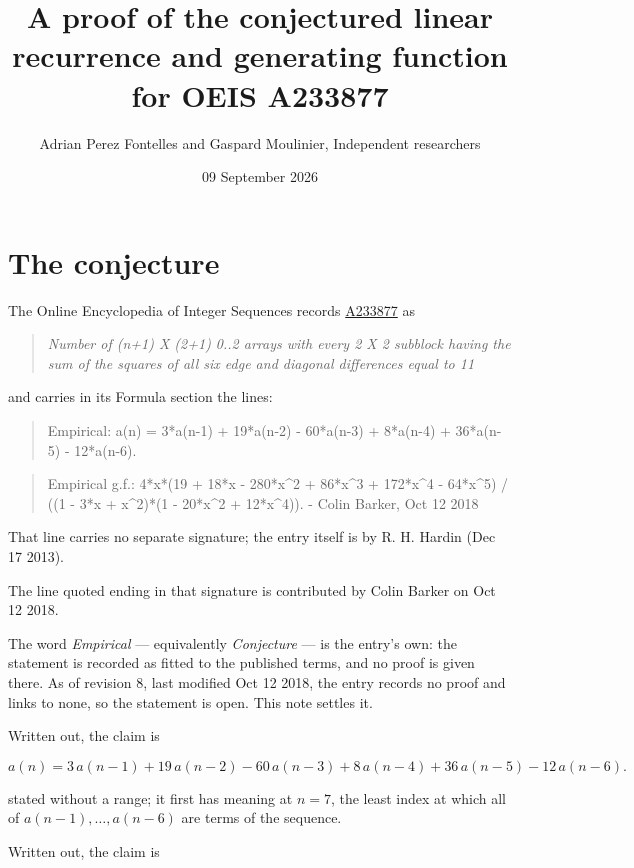 \documentclass[11pt]{article}
\title{A proof of the conjectured linear recurrence and generating function for OEIS A233877}
\author{Adrian Perez Fontelles and Gaspard Moulinier, Independent researchers}
\date{09 September 2026}
\theoremstyle{definition}
\begin{document}
\maketitle
\section{The conjecture}

The Online Encyclopedia of Integer Sequences records \href{https://oeis.org/A233877}{A233877} as

\begin{quote}\itshape Number of (n+1) X (2+1) 0..2 arrays with every 2 X 2 subblock having the sum of the squares of all six edge and diagonal differences equal to 11\end{quote}

and carries in its Formula section the lines:

\begin{quote}\ttfamily Empirical: a(n) = 3*a(n-1) + 19*a(n-2) - 60*a(n-3) + 8*a(n-4) + 36*a(n-5) - 12*a(n-6).\end{quote}

\begin{quote}\ttfamily Empirical g.f.: 4*x*(19 + 18*x - 280*x\textasciicircum{}2 + 86*x\textasciicircum{}3 + 172*x\textasciicircum{}4 - 64*x\textasciicircum{}5) / ((1 - 3*x + x\textasciicircum{}2)*(1 - 20*x\textasciicircum{}2 + 12*x\textasciicircum{}4)). - Colin Barker, Oct 12 2018\end{quote}

That line carries no separate signature; the entry itself is by R. H. Hardin (Dec 17 2013).

The line quoted ending in that signature is contributed by Colin Barker on Oct 12 2018.

The word {\itshape Empirical} --- equivalently {\itshape Conjecture} --- is the entry's own: the statement is recorded as fitted to the published terms, and no proof is given there. As of revision 8, last modified Oct 12 2018, the entry records no proof and links to none, so the statement is open. This note settles it.

Written out, the claim is

\[a(n) = 3\,a(n-1) + 19\,a(n-2) - 60\,a(n-3) + 8\,a(n-4) + 36\,a(n-5) - 12\,a(n-6).\]

stated without a range; it first has meaning at $n = 7$, the least index at which all of $a(n-1),\dots,a(n-6)$ are terms of the sequence.

Written out, the claim is
\end{document}
